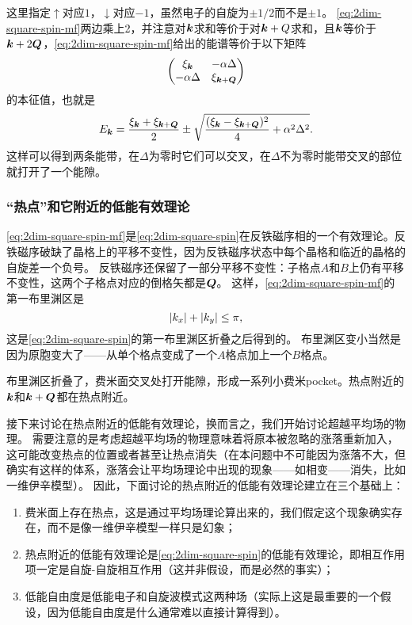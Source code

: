\documentclass[hyperref, UTF8, a4paper]{ctexart}
\begin{document}
这里指定$\uparrow$对应$1$，$\downarrow$对应$-1$，虽然电子的自旋为$\pm 1/2$而不是$\pm 1$。
\eqref{eq:2dim-square-spin-mf}两边乘上2，并注意对$\vb*{k}$求和等价于对$\vb*{k}+Q$求和，且$\vb*{k}$等价于$\vb*{k}+2\vb*{Q}$，\eqref{eq:2dim-square-spin-mf}给出的能谱等价于以下矩阵
\[
    \pmqty{\xi_{\vb*{k}} & - \alpha \Delta \\ - \alpha \Delta & \xi_{\vb*{k} + \vb*{Q}}}
\]
的本征值，也就是
\begin{equation}
    E_{\vb*{k}} = \frac{\xi_{\vb*{k}} + \xi_{\vb*{k} + \vb*{Q}}}{2} \pm \sqrt{\frac{(\xi_{\vb*{k}} - \xi_{\vb*{k}+\vb*{Q}})^2}{4} + \alpha^2 \Delta^2}.
\end{equation}
这样可以得到两条能带，在$\Delta$为零时它们可以交叉，在$\Delta$不为零时能带交叉的部位就打开了一个能隙。

\subsubsection{“热点”和它附近的低能有效理论}

\eqref{eq:2dim-square-spin-mf}是\eqref{eq:2dim-square-spin}在反铁磁序相的一个有效理论。反铁磁序破缺了晶格上的平移不变性，因为反铁磁序状态中每个晶格和临近的晶格的自旋差一个负号。
反铁磁序还保留了一部分平移不变性：子格点$A$和$B$上仍有平移不变性，这两个子格点对应的倒格矢都是$\vb*{Q}$。
这样，\eqref{eq:2dim-square-spin-mf}的第一布里渊区是
\[
    \abs{k_x} + \abs{k_y} \leq \pi,
\]
这是\eqref{eq:2dim-square-spin}的第一布里渊区折叠之后得到的。
布里渊区变小当然是因为原胞变大了——从单个格点变成了一个$A$格点加上一个$B$格点。

布里渊区折叠了，费米面交叉处打开能隙，形成一系列小费米pocket。热点附近的$\vb*{k}$和$\vb*{k} + \vb*{Q}$都在热点附近。

接下来讨论在热点附近的低能有效理论，换而言之，我们开始讨论超越平均场的物理。
需要注意的是考虑超越平均场的物理意味着将原本被忽略的涨落重新加入，这可能改变热点的位置或者甚至让热点消失（在本问题中不可能因为涨落不大，但确实有这样的体系，涨落会让平均场理论中出现的现象——如相变——消失，比如一维伊辛模型）。
因此，下面讨论的热点附近的低能有效理论建立在三个基础上：
\begin{enumerate}
    \item 费米面上存在热点，这是通过平均场理论算出来的，我们假定这个现象确实存在，而不是像一维伊辛模型一样只是幻象；
    \item 热点附近的低能有效理论是\eqref{eq:2dim-square-spin}的低能有效理论，即相互作用项一定是自旋-自旋相互作用（这并非假设，而是必然的事实）；
    \item 低能自由度是低能电子和自旋波模式这两种场（实际上这是最重要的一个假设，因为低能自由度是什么通常难以直接计算得到）。
\end{enumerate}
\end{document}
